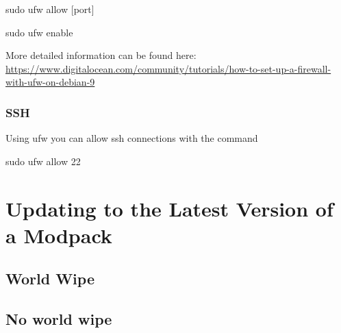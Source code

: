 \documentclass{article}
\begin{document}
sudo ufw allow [port]

sudo ufw enable

More detailed information can be found here:
\url{https://www.digitalocean.com/community/tutorials/how-to-set-up-a-firewall-with-ufw-on-debian-9}

\subsubsection{SSH}
Using ufw you can allow ssh connections with the command

sudo ufw allow 22

\section{Updating to the Latest Version of a Modpack}

\subsection{World Wipe}

\subsection{No world wipe}
\end{document}
